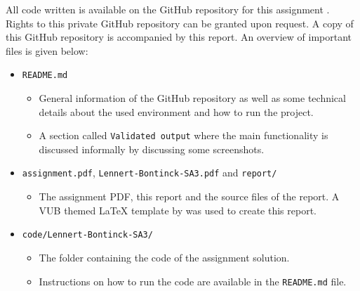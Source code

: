 All code written is available on the GitHub repository for this assignment \citep{github_project}. 
Rights to this private GitHub repository can be granted upon request. 
A copy of this GitHub repository is accompanied by this report.
An overview of important files is given below:
\begin{itemize}
    \item \texttt{README.md}
    \begin{itemize}
        \item General information of the GitHub repository as well as some technical details about the used environment and how to run the project.
        \item A section called \texttt{Validated output} where the main functionality is discussed informally by discussing some screenshots.
    \end{itemize}
    \item \texttt{assignment.pdf}, \texttt{Lennert-Bontinck-SA3.pdf} and \texttt{report/}
    \begin{itemize}
        \item The assignment PDF, this report and the source files of the report. A VUB themed \LaTeX{} template by \citet{latex_template} was used to create this report.
    \end{itemize}
    \item \texttt{code/Lennert-Bontinck-SA3/}
    \begin{itemize}
        \item The folder containing the code of the assignment solution.
        \item Instructions on how to run the code are available in the \texttt{README.md} file.
    \end{itemize}
\end{itemize}